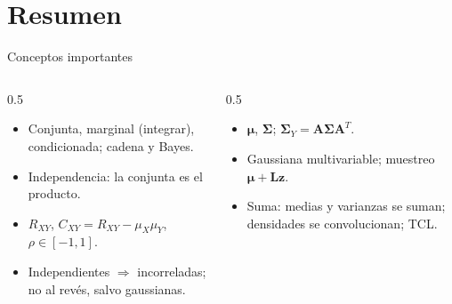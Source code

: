 \documentclass[aspectratio=169,11pt]{beamer}
\begin{document}
\section*{Resumen}
\begin{frame}{Conceptos importantes}
  \begin{columns}[T]
    \begin{column}{0.5\textwidth}
      \begin{itemize}
        \item Conjunta, marginal (integrar), condicionada; cadena y Bayes.
        \item Independencia: la conjunta es el producto.
        \item $R_{XY}$, $C_{XY}=R_{XY}-\mu_X\mu_Y$, $\rho\in[-1,1]$.
        \item Independientes $\Rightarrow$ incorreladas; no al revés, salvo gaussianas.
      \end{itemize}
    \end{column}
    \begin{column}{0.5\textwidth}
      \begin{itemize}
        \item $\boldsymbol\mu$, $\boldsymbol\Sigma$; $\boldsymbol\Sigma_Y=\mathbf A\boldsymbol\Sigma\mathbf A^T$.
        \item Gaussiana multivariable; muestreo $\boldsymbol\mu+\mathbf L\mathbf z$.
        \item Suma: medias y varianzas se suman; densidades se convolucionan; TCL.
      \end{itemize}
    \end{column}
  \end{columns}
  \bigskip
\end{frame}
\end{document}
